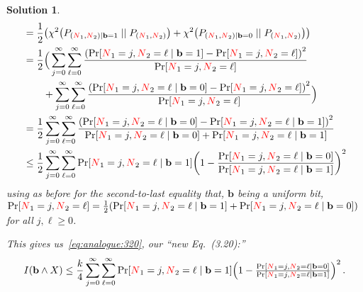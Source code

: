 \documentclass[biber]{nowfnt} %
\newtheorem{solution}{Solution}[chapter]
\newcommand{\occur}{\textcolor{red}{N}}
\newcommand{\occur}{N}
\begin{document}
\begin{solution}
\begin{align*}
	&= \frac{1}{2}\Paren{\chisquare{P_{(\occur_1,\occur_2)\mid \mathbf{b}=\accept}}{P_{(\occur_1,\occur_2)}} + \chisquare{P_{(\occur_1,\occur_2)\mid \mathbf{b}=\reject}}{P_{(\occur_1,\occur_2)}}}\notag\\
	&= \frac{1}{2}\Big(\sum_{j=0}^\infty\sum_{\ell=0}^\infty \frac{\Paren{\bPr{\occur_1=j, \occur_2 = \ell\mid \mathbf{b}=\accept }-\bPr{\occur_1=j, \occur_2 = \ell }}^2}{\bPr{\occur_1=j, \occur_2 = \ell}}  \notag\\
	&\qquad+ \sum_{j=0}^\infty\sum_{\ell=0}^\infty \frac{\Paren{\bPr{\occur_1=j, \occur_2 = \ell\mid \mathbf{b}=\reject }-\bPr{\occur_1=j, \occur_2 = \ell }}^2}{\bPr{\occur_1=j, \occur_2 = \ell}} \Big) \notag\\
	&=\frac{1}{2} \sum_{j=0}^\infty\sum_{\ell=0}^\infty \frac{\Paren{\bPr{\occur_1=j, \occur_2 = \ell\mid \mathbf{b}=\reject }-\bPr{\occur_1=j, \occur_2 = \ell\mid \mathbf{b}=\accept }}^2}{\bPr{\occur_1=j, \occur_2 = \ell\mid \mathbf{b}=\reject }+\bPr{\occur_1=j, \occur_2 = \ell\mid \mathbf{b}=\accept }} \notag\\
	&\leq \frac{1}{2} \sum_{j=0}^\infty\sum_{\ell=0}^\infty \bPr{\occur_1=j, \occur_2 = \ell\mid \mathbf{b}=\accept }\Paren{1-  \frac{\bPr{\occur_1=j, \occur_2 = \ell\mid \mathbf{b}=\reject }}{\bPr{\occur_1=j, \occur_2 = \ell\mid \mathbf{b}=\accept }}  }^2
\end{align*}
using as before for the second-to-last equality that, $\mathbf{b}$ being a uniform bit, $\bPr{\occur_1=j, \occur_2 = \ell} = \frac{1}{2}( \bPr{\occur_1=j, \occur_2 = \ell\mid \mathbf{b}=\accept }+ \bPr{\occur_1=j, \occur_2 = \ell\mid \mathbf{b}=\reject })$ for all $j, \ell\geq 0$.

This gives us~\cref{eq:analogue:320}, our ``new Eq.~(3.20):''
\begin{equation}
	\label{eq:analogue:320}
	\mutualinfo{\mathbf{b}}{X} \leq \frac{\ab}{4} \sum_{j=0}^\infty\sum_{\ell=0}^\infty \bPr{\occur_1=j, \occur_2 = \ell\mid \mathbf{b}=\accept }\Paren{1-  \tfrac{\bPr{\occur_1=j, \occur_2 = \ell\mid \mathbf{b}=\reject }}{\bPr{\occur_1=j, \occur_2 = \ell\mid \mathbf{b}=\accept }}  }^2\,.
\end{equation}


\end{solution}
\end{document}
